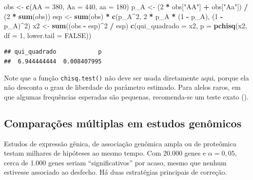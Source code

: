 \documentclass[
]{book}
\newenvironment{Shaded}{\begin{snugshade}}{\end{snugshade}}
\newcommand{\AttributeTok}[1]{\textcolor[rgb]{0.13,0.29,0.53}{#1}}
\newcommand{\ConstantTok}[1]{\textcolor[rgb]{0.56,0.35,0.01}{#1}}
\newcommand{\DecValTok}[1]{\textcolor[rgb]{0.00,0.00,0.81}{#1}}
\newcommand{\FunctionTok}[1]{\textcolor[rgb]{0.13,0.29,0.53}{\textbf{#1}}}
\newcommand{\NormalTok}[1]{#1}
\newcommand{\OtherTok}[1]{\textcolor[rgb]{0.56,0.35,0.01}{#1}}
\newcommand{\SpecialCharTok}[1]{\textcolor[rgb]{0.81,0.36,0.00}{\textbf{#1}}}
\newcommand{\StringTok}[1]{\textcolor[rgb]{0.31,0.60,0.02}{#1}}
\begin{document}
\begin{Shaded}
\begin{Highlighting}[]
\NormalTok{obs }\OtherTok{\textless{}{-}} \FunctionTok{c}\NormalTok{(}\AttributeTok{AA =} \DecValTok{380}\NormalTok{, }\AttributeTok{Aa =} \DecValTok{440}\NormalTok{, }\AttributeTok{aa =} \DecValTok{180}\NormalTok{)}
\NormalTok{p\_A }\OtherTok{\textless{}{-}}\NormalTok{ (}\DecValTok{2} \SpecialCharTok{*}\NormalTok{ obs[}\StringTok{"AA"}\NormalTok{] }\SpecialCharTok{+}\NormalTok{ obs[}\StringTok{"Aa"}\NormalTok{]) }\SpecialCharTok{/}\NormalTok{ (}\DecValTok{2} \SpecialCharTok{*} \FunctionTok{sum}\NormalTok{(obs))}
\NormalTok{esp }\OtherTok{\textless{}{-}} \FunctionTok{sum}\NormalTok{(obs) }\SpecialCharTok{*} \FunctionTok{c}\NormalTok{(p\_A}\SpecialCharTok{\^{}}\DecValTok{2}\NormalTok{, }\DecValTok{2} \SpecialCharTok{*}\NormalTok{ p\_A }\SpecialCharTok{*}\NormalTok{ (}\DecValTok{1} \SpecialCharTok{{-}}\NormalTok{ p\_A), (}\DecValTok{1} \SpecialCharTok{{-}}\NormalTok{ p\_A)}\SpecialCharTok{\^{}}\DecValTok{2}\NormalTok{)}
\NormalTok{x2 }\OtherTok{\textless{}{-}} \FunctionTok{sum}\NormalTok{((obs }\SpecialCharTok{{-}}\NormalTok{ esp)}\SpecialCharTok{\^{}}\DecValTok{2} \SpecialCharTok{/}\NormalTok{ esp)}
\FunctionTok{c}\NormalTok{(}\AttributeTok{qui\_quadrado =}\NormalTok{ x2, }\AttributeTok{p =} \FunctionTok{pchisq}\NormalTok{(x2, }\AttributeTok{df =} \DecValTok{1}\NormalTok{, }\AttributeTok{lower.tail =} \ConstantTok{FALSE}\NormalTok{))}
\end{Highlighting}
\end{Shaded}

\begin{verbatim}
## qui_quadrado            p 
##  6.944444444  0.008407995
\end{verbatim}

Note que a função \texttt{chisq.test()} não deve ser usada diretamente aqui, porque ela não desconta o grau de liberdade do parâmetro estimado. Para alelos raros, em que algumas frequências esperadas são pequenas, recomenda-se um teste exato ().

\subsection{Comparações múltiplas em estudos genômicos}\label{comparauxe7uxf5es-muxfaltiplas-em-estudos-genuxf4micos}

Estudos de expressão gênica, de associação genômica ampla ou de proteômica testam milhares de hipóteses ao mesmo tempo. Com 20.000 genes e \(\alpha = 0{,}05\), cerca de 1.000 genes seriam ``significativos'' por acaso, mesmo que nenhum estivesse associado ao desfecho. Há duas estratégias principais de correção.
\end{document}
